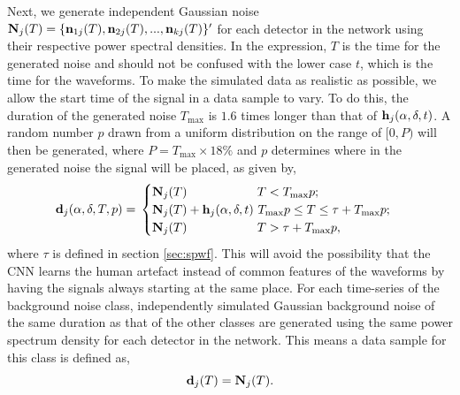 \documentclass[aps,twocolumn,showpacs,groupedaddress, nofootinbib]{revtex4}  %
\begin{document}
%
Next, we generate independent Gaussian noise $\bold{N}_j(T) =
\{\bold{n}_{1j}(T), \bold{n}_{2j}(T), ..., \bold{n}_{kj}(T)\}'$ for each
detector in the network using their respective power spectral
densities. In the expression, $T$ is the time for the generated noise and should not be confused with the lower case $t$, 
which is the time for the waveforms.
To make the simulated data as realistic as possible, 
we allow the start time of the signal in a data sample to vary.
To do this,  the duration of the generated noise $T_{\text{max}}$ is $1.6$ times longer than
that of $\bold{h}_j(\alpha, \delta, t)$. A random number $p$ drawn from 
a uniform distribution on the range of $[0, P)$ 
will then be generated, where
$P = T_{\text{max}}\times 18\% $  and $p$ 
determines where in
the generated noise the signal will be placed, as given by,
%
\begin{equation}
\bold{d}_j(\alpha, \delta, T, p)=
\\
\begin{cases}
\bold{N}_j(T)~~~~~~~~~~~~~~~~~T < T_{\text{max}} p; \\
\bold{N}_j(T) + \bold{h}_j(\alpha, \delta, t)~ T_{\text{max}} p \leq T \leq \tau + T_{\text{max}} p; \\
\bold{N}_j(T)~~~~~~~~~~~~~~~~~T > \tau + T_{\text{max}} p, \\
\end{cases}
\end{equation}
%
where $\tau$ is defined in section \ref{sec:spwf}. 
This will avoid the possibility that the \ac{CNN}
learns the human artefact instead of common features of the waveforms by having
the signals always starting at the same place.
For each time-series of the background noise class, independently simulated Gaussian
background noise  of the
same duration as that of the other classes are generated using the same power spectrum density 
for each detector in the network. This means a data sample for this class is defined as,
%
\begin{equation}\label{eq:noise}
 \bold{d}_j(T) = \bold{N}_j(T).
\end{equation}
\end{document}
